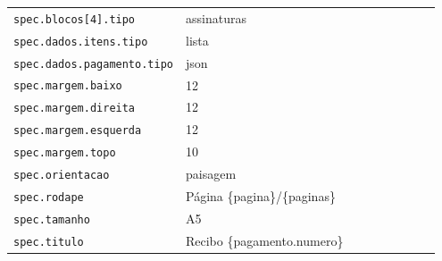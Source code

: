 \begin{tabular}{@{}p{0.35\linewidth}p{0.6\linewidth}@{}}
\texttt{spec.blocos[4].tipo} & assinaturas \\
\texttt{spec.dados.itens.tipo} & lista \\
\texttt{spec.dados.pagamento.tipo} & json \\
\texttt{spec.margem.baixo} & 12 \\
\texttt{spec.margem.direita} & 12 \\
\texttt{spec.margem.esquerda} & 12 \\
\texttt{spec.margem.topo} & 10 \\
\texttt{spec.orientacao} & paisagem \\
\texttt{spec.rodape} & Página \{pagina\}/\{paginas\} \\
\texttt{spec.tamanho} & A5 \\
\texttt{spec.titulo} & Recibo \{pagamento.numero\} \\
\end{tabular}

